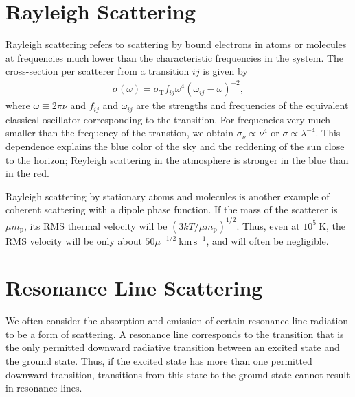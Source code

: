 \section{Rayleigh Scattering}

Rayleigh scattering refers to scattering by bound electrons
in atoms or molecules at frequencies much lower than the
characteristic frequencies in the system. The cross-section
per scatterer from a transition $ij$ is given by
\begin{align}
\sigma(\omega) = \sigma_\mathrm{T} f_{ij} \omega^4(
\omega_{ij} - \omega)^{-2},
\end{align}
where $\omega \equiv 2\pi\nu$ and $f_{ij}$ and $\omega_{ij}$
are the strengths and frequencies of the equivalent
classical oscillator corresponding to the transition. For
frequencies very much smaller than the frequency of the
transtion, we obtain $\sigma_\nu \propto \nu^4$ or $\sigma
\propto \lambda^{-4}$. This dependence explains the blue
color of the sky and the reddening of the sun close to the
horizon; Reyleigh scattering in the atmosphere is stronger
in the blue than in the red.

Rayleigh scattering by stationary atoms and molecules is
another example of coherent scattering with a dipole phase
function. If the mass of the scatterer is $\mu
m_\mathrm{p}$, its RMS thermal velocity will be $(3 kT/ \mu
m_\mathrm{p})^{1/2}$. Thus, even at $10^5\ \mathrm{K}$, the
RMS velocity will be only about $50\mu^{-1/2} \mathrm{\
km\,s^{-1}}$, and will often be negligible.

\section{Resonance Line Scattering}

We often consider the absorption and emission of certain
resonance line radiation to be a form of scattering. A
resonance line corresponds to the transition that is the
only permitted downward radiative transition between an
excited state and the ground state. Thus, if the excited
state has more than one permitted downward transition,
transitions from this state to the ground state cannot
result in resonance lines.

